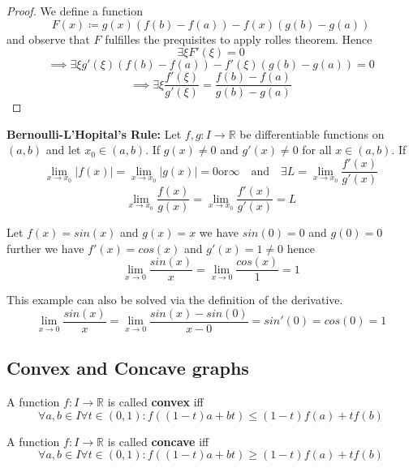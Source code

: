 \begin{proof}
    We define a function
    $$F(x) \coloneqq g(x)(f(b)-f(a)) - f(x)(g(b)-g(a))$$
    and observe that $F$ fulfilles the prequisites to apply rolles theorem. Hence 
    $$\exists \xi F'(\xi) = 0$$
    $$\implies \exists \xi g'(\xi)(f(b)-f(a)) - f'(\xi)(g(b)-g(a)) = 0$$
    $$\implies \exists \xi \frac{f'(\xi)}{g'(\xi)} = \frac{f(b)-f(a)}{g(b)-g(a)}$$
\end{proof}

\begin{theorem}
    \textbf{Bernoulli-L'Hopital's Rule:} Let $f, g: I \to \mathbb{R}$ be differentiable functions on $(a, b)$ and let $x_0 \in (a, b)$. If $g(x) \neq 0$ and $g'(x) \neq 0$ for all $x \in (a, b)$. If 
    $$\lim_{x \to x_0} |f(x)| = \lim_{x \to x_0} |g(x)| = 0 \text{or} \infty \quad  \text{and} \quad \exists L = \lim_{x \to x_0} \frac{f'(x)}{g'(x)}$$
    $$\lim_{x \to x_0} \frac{f(x)}{g(x)} = \lim_{x \to x_0} \frac{f'(x)}{g'(x)} = L$$
\end{theorem}

\begin{example}
    Let $f(x) = sin(x)$ and $g(x) = x$ we have $sin(0) = 0$ and $g(0) = 0$ further we have $f'(x) = cos(x)$ and $g'(x) = 1 \neq 0$ hence 
    $$\lim_{x \to 0} \frac{sin(x)}{x} = \lim_{x \to 0} \frac{cos(x)}{1} = 1$$
\end{example}

\begin{remark}
    This example can also be solved via the definition of the derivative.
    $$\lim_{x \to 0} \frac{sin(x)}{x} = \lim_{x \to 0} \frac{sin(x)-sin(0)}{x-0} = sin'(0) = cos(0) = 1$$
\end{remark}

\subsection{Convex and Concave graphs}

\begin{definition}
    A function $f: I \to \mathbb{R}$ is called \textbf{convex} iff 
    $$\forall a, b \in I \forall t \in (0, 1) : f((1-t)a + bt) \leq (1-t) f(a) + t f(b)$$
\end{definition}

\begin{definition}
    A function $f: I \to \mathbb{R}$ is called \textbf{concave} iff 
    $$\forall a, b \in I \forall t \in (0, 1) : f((1-t)a + bt) \geq (1-t) f(a) + t f(b)$$
\end{definition}

